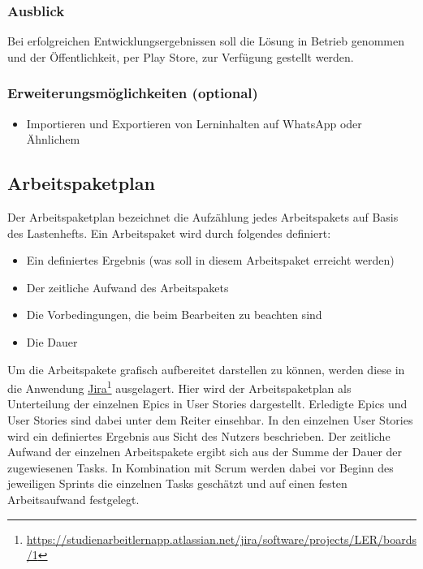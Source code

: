 \subsubsection{Ausblick}
Bei erfolgreichen Entwicklungsergebnissen soll die Lösung in Betrieb genommen und der Öffentlichkeit, per Play Store, zur Verfügung gestellt werden.

\subsubsection{Erweiterungsmöglichkeiten (optional)}
\begin{itemize}
    \item Importieren und Exportieren von Lerninhalten auf WhatsApp oder Ähnlichem
\end{itemize}


\subsection{Arbeitspaketplan}
\label{sec:arbeitspaketplan}
Der Arbeitspaketplan bezeichnet die Aufzählung jedes Arbeitspakets auf Basis des Lastenhefts. \newline Ein Arbeitspaket wird durch folgendes definiert: 
\begin{itemize}
    \item Ein definiertes Ergebnis (was soll in diesem Arbeitspaket erreicht werden)
    \item Der zeitliche Aufwand des Arbeitspakets
    \item Die Vorbedingungen, die beim Bearbeiten zu beachten sind
    \item Die Dauer
\end{itemize}


\noindent
Um die Arbeitspakete grafisch aufbereitet darstellen zu können, werden diese in die Anwendung \href{https://studienarbeitlernapp.atlassian.net/jira/software/projects/LER/boards/1}{\underline{Jira}}\footnote{\href{https://studienarbeitlernapp.atlassian.net/jira/software/projects/LER/boards/1}{https://studienarbeitlernapp.atlassian.net/jira/software/projects/LER/boards/1}} ausgelagert.
Hier wird der Arbeitspaketplan als Unterteilung der einzelnen Epics in User Stories dargestellt.
Erledigte Epics und User Stories sind dabei unter dem Reiter  einsehbar.
In den einzelnen User Stories wird ein definiertes Ergebnis aus Sicht des Nutzers beschrieben.
Der zeitliche Aufwand der einzelnen Arbeitspakete ergibt sich aus der Summe der Dauer der zugewiesenen Tasks. 
In Kombination mit Scrum werden dabei vor Beginn des jeweiligen Sprints die einzelnen Tasks geschätzt und auf einen festen Arbeitsaufwand festgelegt. 

